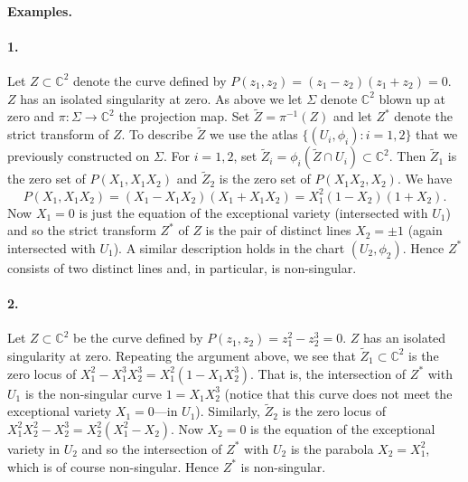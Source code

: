 \paragraph*{Examples.}
\paragraph*{1.} Let $Z\subset\mathbb C^2$ denote the curve defined by $P(z_1,z_2)=(z_1-z_2)(z_1+z_2)=0$. $Z$ has an isolated singularity at zero. As above we let $\Sigma$ denote $\mathbb C^2$ blown up at zero and $\pi:\Sigma\longrightarrow\mathbb C^2$ the projection map. Set $\widetilde Z=\pi^{-1}(Z)$ and let $Z^*$ denote the strict transform of $Z$. To describe $\widetilde Z$ we use the atlas $\{(U_i,\phi_i):i=1,2\}$ that we previously constructed on $\Sigma$. For $i=1,2$, set $\widetilde Z_i=\phi_i(\widetilde Z\cap U_i)\subset\mathbb C^2$. Then $\widetilde Z_1$ is the zero set of $P(X_1,X_1X_2)$ and $\widetilde Z_2$ is the zero set of $P(X_1X_2,X_2)$. We have
\[
P(X_1,X_1X_2)=(X_1-X_1X_2)(X_1+X_1X_2)=X_1^2(1-X_2)(1+X_2).
\]
Now $X_1=0$ is just the equation of the exceptional variety (intersected with $U_1$) and so the strict transform $Z^*$ of $Z$ is the pair of distinct lines $X_2=\pm1$ (again intersected with $U_1$). A similar description holds in the chart $(U_2,\phi_2)$. Hence $Z^*$ consists of two distinct lines and, in particular, is non-singular.

\begin{center}
    \begin{minipage}{\linewidth}
        \centering
        
    \end{minipage}
\end{center}
\paragraph*{2.} Let $Z\subset\mathbb C^2$ be the curve defined by $P(z_1,z_2)=z_1^2-z_2^3=0$. $Z$ has an isolated singularity at zero. Repeating the argument above, we see that $\widetilde Z_1\subset\mathbb C^2$ is the zero locus of $X_1^2-X_1^3X_2^3=X_1^2(1-X_1X_2^3)$. That is, the intersection of $Z^*$ with $U_1$ is the non-singular curve $1=X_1X_2^3$ (notice that this curve does not meet the exceptional variety $X_1=0$---in $U_1$). Similarly, $\widetilde Z_2$ is the zero locus of $X_1^2X_2^2-X_2^3=X_2^2(X_1^2-X_2)$. Now $X_2=0$ is the equation of the exceptional variety in $U_2$ and so the intersection of $Z^*$ with $U_2$ is the parabola $X_2=X_1^2$, which is of course non-singular. Hence $Z^*$ is non-singular.

